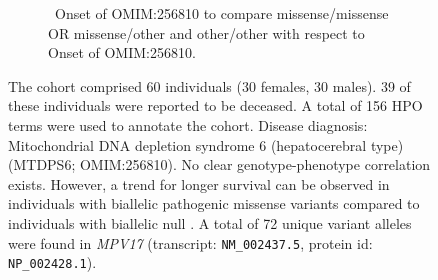 \begin{figure}[htbp]
        \vspace{0.2em}
        
        \begin{subfigure}[b]{0.95\textwidth}
        \captionsetup{justification=raggedright,singlelinecheck=false}
        \caption{ Onset of OMIM:256810 to compare missense/missense OR missense/other and other/other with respect to Onset of OMIM:256810. }
        \end{subfigure}
        
        \vspace{0.2em}
        
        \caption{ The cohort comprised 60 individuals (30 females, 30 males). 39 of these individuals were reported to be deceased. 
        A total of 156 HPO terms were used to annotate the cohort. Disease diagnosis: Mitochondrial DNA depletion syndrome 6 (hepatocerebral type) (MTDPS6; OMIM:256810). 
        No clear genotype-phenotype correlation exists. However, a trend for longer survival can be observed in individuals with biallelic pathogenic 
        missense variants compared to individuals with biallelic null \cite{PMID_20074988,PMID_22593919}. 
        A total of 72 unique variant alleles were found in \textit{MPV17} (transcript: \texttt{NM\_002437.5}, protein id: \texttt{NP\_002428.1}).}
        \end{figure}
        